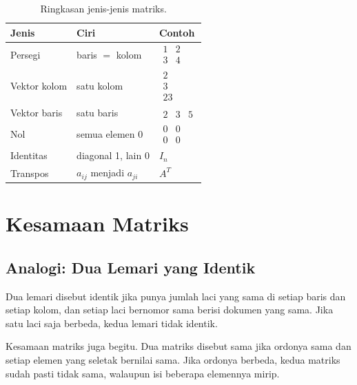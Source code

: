 \documentclass[11pt,a4paper]{article}
\begin{document}
\begin{table}[H]
	\centering
	\caption{Ringkasan jenis-jenis matriks.}
	\label{tab:jenis-matriks}
	\small
	\begin{tabularx}{\textwidth}{l X X}
		\toprule
		Jenis        & Ciri                      & Contoh                                         \\
		\midrule
		Persegi      & baris $=$ kolom           & $\begin{smallmatrix}1&2\\3&4\end{smallmatrix}$ \\
		Vektor kolom & satu kolom                & $\begin{smallmatrix}2\\3\\23\end{smallmatrix}$ \\
		Vektor baris & satu baris                & $\begin{smallmatrix}2&3&5\end{smallmatrix}$    \\
		Nol          & semua elemen 0            & $\begin{smallmatrix}0&0\\0&0\end{smallmatrix}$ \\
		Identitas    & diagonal 1, lain 0        & $I_n$                                          \\
		Transpos     & $a_{ij}$ menjadi $a_{ji}$ & $A^T$                                          \\
		\bottomrule
	\end{tabularx}
\end{table}

\section{Kesamaan Matriks}

\subsection{Analogi: Dua Lemari yang Identik}

Dua lemari disebut identik jika punya jumlah laci yang sama di setiap baris dan setiap kolom, dan setiap laci bernomor sama berisi dokumen yang sama. Jika satu laci saja berbeda, kedua lemari tidak identik.

Kesamaan matriks juga begitu. Dua matriks disebut sama jika ordonya sama dan setiap elemen yang seletak bernilai sama. Jika ordonya berbeda, kedua matriks sudah pasti tidak sama, walaupun isi beberapa elemennya mirip.
\end{document}
